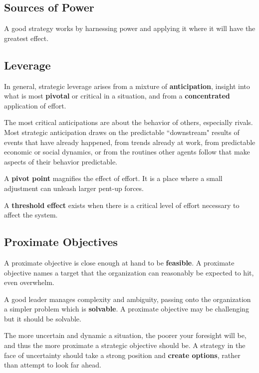 \documentclass{article}
\begin{document}
\begin{center}
\section{Sources of Power}
\end{center}

\begin{multicols}{2}

\noindent
A good strategy works by harnessing power and applying it where it will have the greatest effect.

\subsection{Leverage}
In general, strategic leverage arises from a mixture of \textbf{anticipation}, insight into what is most \textbf{pivotal} or critical in a situation, and from a \textbf{concentrated} application of effort.

The most critical anticipations are about the behavior of others, especially rivals. Most strategic anticipation draws on the predictable ``downstream" results of events that have already happened, from trends already at work, from predictable economic or social dynamics, or from the routines other agents follow that make aspects of their behavior predictable.

A \textbf{pivot point} magnifies the effect of effort. It is a place where a small adjustment can unleash larger pent-up forces.

A \textbf{threshold effect} exists when there is a critical level of effort necessary to affect the system.

\subsection{Proximate Objectives}

A proximate objective is close enough at hand to be \textbf{feasible}. A proximate objective names a target that the organization can reasonably be expected to hit, even overwhelm.

A good leader manages complexity and ambiguity, passing onto the organization a simpler problem which is \textbf{solvable}. A proximate objective may be challenging but it should be solvable.

The more uncertain and dynamic a situation, the poorer your foresight will be, and thus the more proximate a strategic objective should be. A strategy in the face of uncertainty should take a strong position and \textbf{create options}, rather than attempt to look far ahead.


\end{multicols}
\end{document}
